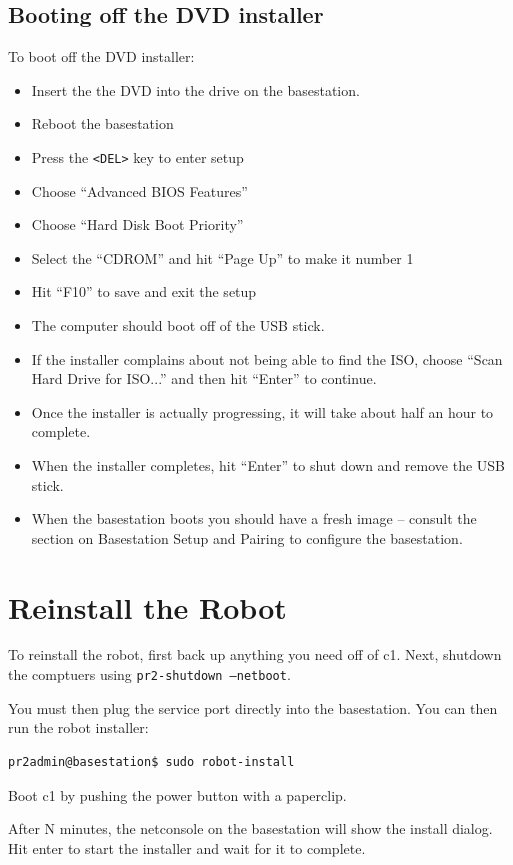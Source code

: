 \subsection{Booting off the DVD installer}
To boot off the DVD installer:
\begin{itemize}
\item Insert the the DVD into the drive on the basestation.
\item Reboot the basestation
\item Press the \texttt{<DEL>} key to enter setup
\item Choose ``Advanced BIOS Features''
\item Choose ``Hard Disk Boot Priority''
\item Select the ``CDROM'' and hit ``Page Up'' to make it number 1
\item Hit ``F10'' to save and exit the setup
\item The computer should boot off of the USB stick.
\item If the installer complains about not being able to find the ISO,
  choose ``Scan Hard Drive for ISO...'' and then hit ``Enter'' to
  continue.
\item Once the installer is actually progressing, it will take about half an hour to complete.
\item When the installer completes, hit ``Enter'' to shut down and remove the USB stick.
\item When the basestation boots you should have a fresh image -- consult the section on Basestation Setup and Pairing to configure the basestation.
\end{itemize}

\section{Reinstall the Robot}

To reinstall the robot, first back up anything you need off of c1.
Next, shutdown the comptuers using \texttt{pr2-shutdown --netboot}.

You must then plug the service port directly into the basestation.
You can then run the robot installer:

\begin{verbatim}
pr2admin@basestation$ sudo robot-install
\end{verbatim}

Boot c1 by pushing the power button with a paperclip.

After N minutes, the netconsole on the basestation will show the
install dialog.  Hit enter to start the installer and wait for it to
complete.

